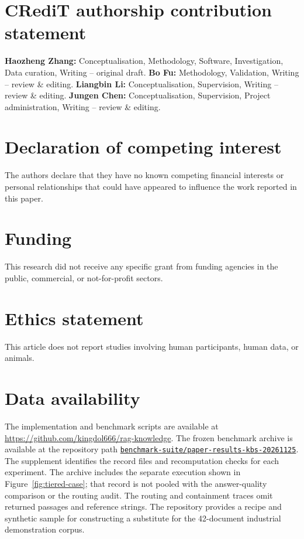 
\section*{CRediT authorship contribution statement}
\textbf{Haozheng Zhang:} Conceptualisation, Methodology, Software,
Investigation, Data curation, Writing -- original draft.
\textbf{Bo Fu:} Methodology, Validation, Writing -- review \& editing.
\textbf{Liangbin Li:} Conceptualisation, Supervision, Writing -- review \& editing.
\textbf{Jungen Chen:} Conceptualisation, Supervision, Project administration,
Writing -- review \& editing.

\section*{Declaration of competing interest}
The authors declare that they have no known competing financial interests
or personal relationships that could have appeared to influence the work
reported in this paper.

\section*{Funding}
This research did not receive any specific grant from funding agencies in
the public, commercial, or not-for-profit sectors.

\section*{Ethics statement}
This article does not report studies involving human participants, human
data, or animals.

\section*{Data availability}
The implementation and benchmark scripts are available at
\url{https://github.com/kingdol666/rag-knowledge}. The frozen benchmark
archive is available at the repository path
\href{https://github.com/kingdol666/rag-knowledge/tree/092e8bf2d65859dcd684071ed4169a40fbbc1563/benchmark-suite/paper-results-kbs-20261125}{\nolinkurl{benchmark-suite/paper-results-kbs-20261125}}.
The supplement identifies the record files and recomputation checks for
each experiment. The archive includes the separate execution shown in
Figure~\ref{fig:tiered-case}; that record is not pooled with the
answer-quality comparison or the routing audit. The routing and containment
traces omit returned passages and reference strings. The repository provides
a recipe and synthetic sample for constructing a substitute for the
42-document industrial demonstration corpus.


